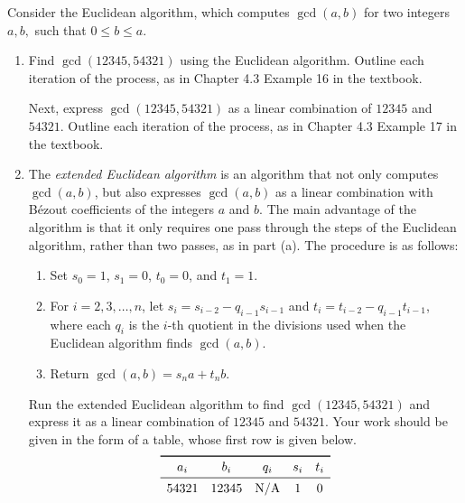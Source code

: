 \documentclass{article}
\begin{document}
    \vspace{1.5mm}
    Consider the Euclidean algorithm, which computes $\gcd(a, b)$ for two integers $a, b,$ such that $0 \le b \le a$.
    \begin{enumerate}
        \item Find $\gcd(12345, 54321)$ using the Euclidean algorithm. Outline each iteration of the process, as in Chapter 4.3 Example 16 in the textbook.
        
        \vspace{1.5mm}
        Next, express $\gcd(12345, 54321)$ as a linear combination of $12345$ and $54321$. Outline each iteration of the process, as in Chapter 4.3 Example 17 in the textbook.
        
        \item The \textit{extended Euclidean algorithm} is an algorithm that not only computes $\gcd(a, b)$, but also expresses $\gcd(a, b)$ as a linear combination with B\'ezout coefficients of the integers $a$ and $b$. The main advantage of the algorithm is that it only requires one pass through the steps of the Euclidean algorithm, rather than two passes, as in part (a). The procedure is as follows:
        \begin{enumerate}[leftmargin=1.2in]
            \item [\textbf{Initialization.}] Set $s_{0} = 1$, $s_{1} = 0$, $t_{0} = 0$, and $t_{1} = 1$.
            \item [\textbf{Inductive Step.}] For $i = 2,3,\dots,n$, let $s_{i} = s_{i - 2} - q_{i - 1}s_{i - 1}$ and $t_{i} = t_{i - 2} - q_{i - 1}t_{i - 1}$, where each $q_{i}$ is the $i$-th quotient in the divisions used when the Euclidean algorithm finds $\gcd(a,b)$.
            \item [\textbf{Termination.}] Return $\gcd(a, b) = s_{n}a + t_{n}b$. 
        \end{enumerate}
        
        \vspace{2mm}
        Run the extended Euclidean algorithm to find $\gcd(12345, 54321)$ and express it as a linear combination of $12345$ and $54321$. Your work should be given in the form of a table, whose first row is given below.
        $$\begin{array}{ccccc}
            \toprule
            a_{i} & b_{i} & q_{i} & s_{i} & t_{i} \\
            \midrule
            54321 & 12345 & \text{N/A} & 1 & 0
        \end{array}$$
    \end{enumerate}
\end{document}
